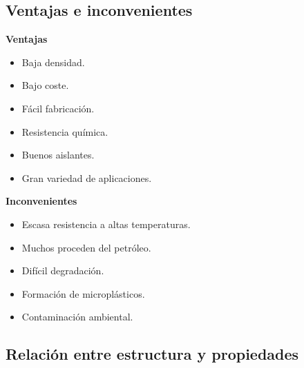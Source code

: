 
\subsection{Ventajas e inconvenientes}

\begin{minipage}{0.48\textwidth}

\textbf{Ventajas}

\begin{itemize}

\item Baja densidad.

\item Bajo coste.

\item Fácil fabricación.

\item Resistencia química.

\item Buenos aislantes.

\item Gran variedad de aplicaciones.

\end{itemize}

\end{minipage}
\hfill
\begin{minipage}{0.48\textwidth}

\textbf{Inconvenientes}

\begin{itemize}

\item Escasa resistencia a altas temperaturas.

\item Muchos proceden del petróleo.

\item Difícil degradación.

\item Formación de microplásticos.

\item Contaminación ambiental.

\end{itemize}

\end{minipage}


\subsection{Relación entre estructura y propiedades}

